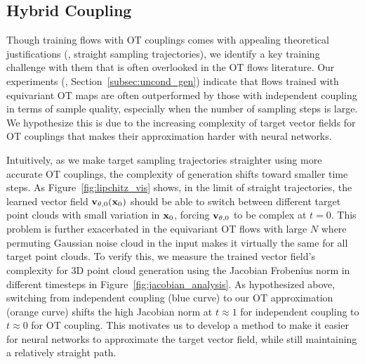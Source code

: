 \vspace{-6mm}
\subsection{Hybrid Coupling}
\label{subsec:coupling_interpolation}
\vspace{-2mm}
Though training flows with OT couplings comes with appealing theoretical justifications (\eg, straight sampling trajectories), we identify a key training challenge with them that is often overlooked in the OT flows literature. Our experiments (\eg, Section~\ref{subsec:uncond_gen}) indicate that flows trained with equivariant OT maps are often outperformed by those with independent coupling in terms of sample quality, especially when the number of sampling steps is large. We hypothesize this is due to the increasing complexity of target vector fields for OT couplings that makes their approximation harder with neural networks. 


Intuitively, as we make target sampling trajectories straighter using more accurate OT couplings, the complexity of generation shifts toward smaller time steps. As Figure~\ref{fig:lipchitz_vis} shows, in the limit of straight trajectories, the learned vector field ${\mathbf{v}}_{\theta, 0}({\mathbf{x}}_0)$ should be able to switch between different target point clouds with small variation in ${\mathbf{x}}_0$, forcing ${\mathbf{v}}_{\theta, 0}$ to be complex at $t{=}0$. This problem is further exacerbated in the equivariant OT flows with large $N$ where permuting Gaussian noise cloud in the input makes it virtually the same for all target point clouds. To verify this, we measure the trained vector field's complexity for 3D point cloud generation using the Jacobian Frobenius norm in different timesteps in Figure~\ref{fig:jacobian_analysis}. As hypothesized above, switching from independent coupling (blue curve) to our OT approximation (orange curve) shifts the high Jacobian norm at $t\approx1$ for independent coupling to $t\approx0$ for OT coupling. This motivates us to develop a method to make 
it easier for neural networks to approximate the target vector field, 
while still maintaining a relatively straight path.


%


